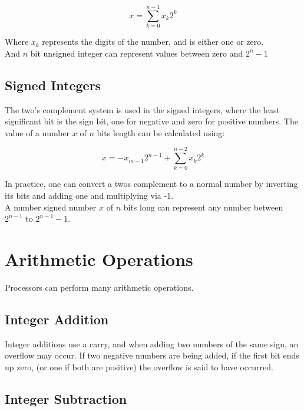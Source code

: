 \documentclass[11pt,a4paper,twocolumn]{book}
\begin{document}
\begin{equation}
x = \sum_{k= 0}^{n - 1} x_k 2^k
\end{equation}

Where $x_k$ represents the digits of the number, and is  either one or zero.\\

And $n$ bit unsigned integer can represent values between zero and $2^n - 1$

\subsection{Signed Integers}

The two's complement system is used in the signed integers, where the least significant bit is the sign bit, one for negative and zero for positive numbers. The value of a number $x$ of $n$ bits length can be calculated using:

\begin{equation}
x = -x_{m -1} 2^{n-1} + \sum_{k = 0}^{n - 2}x_{k}2^k
\end{equation}

In practice, one can convert a twos complement to a normal number by inverting its bits and adding one and multiplying via -1.\\

A number signed number $x$ of $n$ bits long can represent any number between $2^{n - 1}$ to $2^{n - 1} - 1$.

\section{Arithmetic Operations}

Processors can perform many arithmetic operations.

\subsection{Integer Addition}

Integer additions use a carry, and when adding two numbers of the same sign, an overflow may occur. If two negative numbers are being added, if the first bit ends up zero, (or one if both are positive) the overflow is said to have occurred. 

\subsection{Integer Subtraction}
\end{document}
